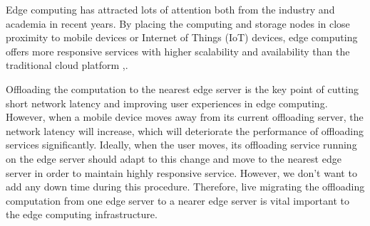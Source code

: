 


Edge computing has attracted lots of attention both from the industry and academia in recent years\cite{satya2009case,  MEC2014initiative, MEC2015-5G, yi2015fog,yi2015survey, satya2017edge}.
By placing the computing and storage nodes in close proximity to mobile devices or Internet of Things (IoT) devices, edge computing offers more responsive services with higher scalability and availability than the traditional cloud platform \cite{MEC2014initiative},\cite{satya2017edge}.

Offloading the computation to the nearest edge server is the key point of cutting short network latency and improving user experiences in edge computing. 
However, when a mobile device moves away from its current offloading server, the network latency will increase, which will deteriorate the performance of offloading services significantly. Ideally, when the user moves, its offloading service running on the edge server should adapt to this change and move to the nearest edge server in order to maintain highly responsive service. However, we don't want to add any down time during this procedure.
Therefore, live migrating the offloading computation from one edge server to a nearer edge server is vital important to the edge computing infrastructure. 

